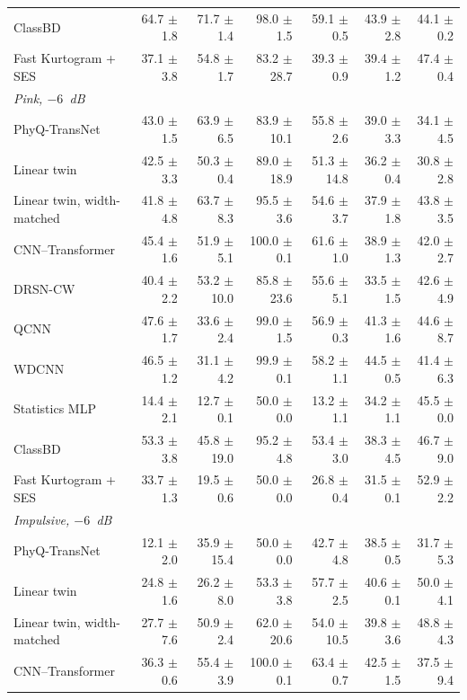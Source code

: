 \begin{table}[p]
\begin{tabular}{lrrrrrr}
ClassBD & 64.7 $\pm$ 1.8 & 71.7 $\pm$ 1.4 & 98.0 $\pm$ 1.5 & 59.1 $\pm$ 0.5 & 43.9 $\pm$ 2.8 & 44.1 $\pm$ 0.2 \\
Fast Kurtogram + SES & 37.1 $\pm$ 3.8 & 54.8 $\pm$ 1.7 & 83.2 $\pm$ 28.7 & 39.3 $\pm$ 0.9 & 39.4 $\pm$ 1.2 & 47.4 $\pm$ 0.4 \\
\midrule
\multicolumn{7}{l}{\emph{Pink, $-6$~dB}} \\
PhyQ-TransNet & 43.0 $\pm$ 1.5 & 63.9 $\pm$ 6.5 & 83.9 $\pm$ 10.1 & 55.8 $\pm$ 2.6 & 39.0 $\pm$ 3.3 & 34.1 $\pm$ 4.5 \\
Linear twin & 42.5 $\pm$ 3.3 & 50.3 $\pm$ 0.4 & 89.0 $\pm$ 18.9 & 51.3 $\pm$ 14.8 & 36.2 $\pm$ 0.4 & 30.8 $\pm$ 2.8 \\
Linear twin, width-matched & 41.8 $\pm$ 4.8 & 63.7 $\pm$ 8.3 & 95.5 $\pm$ 3.6 & 54.6 $\pm$ 3.7 & 37.9 $\pm$ 1.8 & 43.8 $\pm$ 3.5 \\
CNN--Transformer & 45.4 $\pm$ 1.6 & 51.9 $\pm$ 5.1 & 100.0 $\pm$ 0.1 & 61.6 $\pm$ 1.0 & 38.9 $\pm$ 1.3 & 42.0 $\pm$ 2.7 \\
DRSN-CW & 40.4 $\pm$ 2.2 & 53.2 $\pm$ 10.0 & 85.8 $\pm$ 23.6 & 55.6 $\pm$ 5.1 & 33.5 $\pm$ 1.5 & 42.6 $\pm$ 4.9 \\
QCNN & 47.6 $\pm$ 1.7 & 33.6 $\pm$ 2.4 & 99.0 $\pm$ 1.5 & 56.9 $\pm$ 0.3 & 41.3 $\pm$ 1.6 & 44.6 $\pm$ 8.7 \\
WDCNN & 46.5 $\pm$ 1.2 & 31.1 $\pm$ 4.2 & 99.9 $\pm$ 0.1 & 58.2 $\pm$ 1.1 & 44.5 $\pm$ 0.5 & 41.4 $\pm$ 6.3 \\
Statistics MLP & 14.4 $\pm$ 2.1 & 12.7 $\pm$ 0.1 & 50.0 $\pm$ 0.0 & 13.2 $\pm$ 1.1 & 34.2 $\pm$ 1.1 & 45.5 $\pm$ 0.0 \\
ClassBD & 53.3 $\pm$ 3.8 & 45.8 $\pm$ 19.0 & 95.2 $\pm$ 4.8 & 53.4 $\pm$ 3.0 & 38.3 $\pm$ 4.5 & 46.7 $\pm$ 9.0 \\
Fast Kurtogram + SES & 33.7 $\pm$ 1.3 & 19.5 $\pm$ 0.6 & 50.0 $\pm$ 0.0 & 26.8 $\pm$ 0.4 & 31.5 $\pm$ 0.1 & 52.9 $\pm$ 2.2 \\
\midrule
\multicolumn{7}{l}{\emph{Impulsive, $-6$~dB}} \\
PhyQ-TransNet & 12.1 $\pm$ 2.0 & 35.9 $\pm$ 15.4 & 50.0 $\pm$ 0.0 & 42.7 $\pm$ 4.8 & 38.5 $\pm$ 0.5 & 31.7 $\pm$ 5.3 \\
Linear twin & 24.8 $\pm$ 1.6 & 26.2 $\pm$ 8.0 & 53.3 $\pm$ 3.8 & 57.7 $\pm$ 2.5 & 40.6 $\pm$ 0.1 & 50.0 $\pm$ 4.1 \\
Linear twin, width-matched & 27.7 $\pm$ 7.6 & 50.9 $\pm$ 2.4 & 62.0 $\pm$ 20.6 & 54.0 $\pm$ 10.5 & 39.8 $\pm$ 3.6 & 48.8 $\pm$ 4.3 \\
CNN--Transformer & 36.3 $\pm$ 0.6 & 55.4 $\pm$ 3.9 & 100.0 $\pm$ 0.1 & 63.4 $\pm$ 0.7 & 42.5 $\pm$ 1.5 & 37.5 $\pm$ 9.4 \\

\end{tabular}
\end{table}
